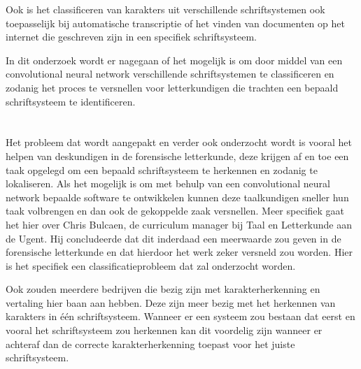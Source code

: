 Ook is het classificeren van karakters uit verschillende schriftsystemen ook toepasselijk bij automatische transcriptie of het vinden van documenten op het internet die geschreven zijn in een specifiek schriftsysteem.

In dit onderzoek wordt er nagegaan of het mogelijk is om door middel van een convolutional neural network verschillende schriftsystemen te classificeren en zodanig het proces te versnellen voor letterkundigen die trachten een bepaald schriftsysteem te identificeren. 

 

\section{}
\label{sec:probleemstelling}


Het probleem dat wordt aangepakt en verder ook onderzocht wordt is vooral het helpen van deskundigen in de forensische letterkunde, deze krijgen af en toe een taak opgelegd om een bepaald schriftsysteem te herkennen en zodanig te lokaliseren.
Als het mogelijk is om met behulp van een convolutional neural network bepaalde software te ontwikkelen kunnen deze taalkundigen sneller hun taak volbrengen en dan ook de gekoppelde zaak versnellen.
Meer specifiek gaat het hier over Chris Bulcaen, de curriculum manager bij Taal en Letterkunde aan de Ugent.
Hij concludeerde dat dit inderdaad een meerwaarde zou geven in de forensische letterkunde en dat hierdoor het werk zeker versneld zou worden.
Hier is het specifiek een classificatieprobleem dat zal onderzocht worden.

Ook zouden meerdere bedrijven die bezig zijn met karakterherkenning en vertaling hier baan aan hebben.
Deze zijn meer bezig met het herkennen van karakters in één schriftsysteem.
Wanneer er een systeem zou bestaan dat eerst en vooral het schriftsysteem zou herkennen kan dit voordelig zijn wanneer er achteraf dan de correcte karakterherkenning toepast voor het juiste schriftsysteem.




